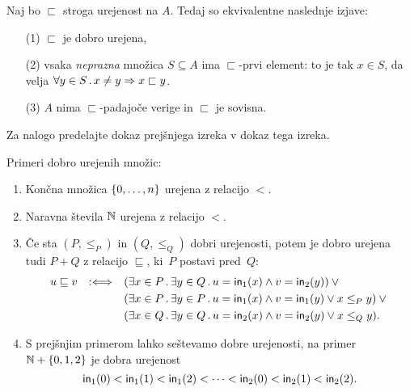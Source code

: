 \begin{izrek}
  \label{izr:dobra-urejenost-karakterizacija}
  Naj bo $\sqsubset$ stroga urejenost na $A$. Tedaj so ekvivalentne naslednje izjave:
  \begin{enumerate}
  \item[(1)] $\sqsubset$ je dobro urejena,
  \item[(2)] vsaka \emph{neprazna} množica $S \subseteq A$ ima $\sqsubset$-prvi element: to je tak $x \in S$, da velja
    $\forall y \in S \,.\, x \neq y \Rightarrow x \sqsubset y$.
  \item[(3)] $A$ nima $\sqsubset$-padajoče verige in $\sqsubset$ je sovisna.
  \end{enumerate}
\end{izrek}

\begin{dokaz}
  Za nalogo predelajte dokaz prejšnjega izreka v dokaz tega izreka.
\end{dokaz}

\begin{primer}
  Primeri dobro urejenih množic:
  \begin{enumerate}
  \item Končna množica $\left\{0, \ldots, n\right\}$ urejena z relacijo $<$.

  \item Naravna števila $\mathbb{N}$ urejena z relacijo $<$.

  \item Če sta $(P, \leq_P)$ in $(Q, \leq_Q)$ dobri urejenosti, potem je dobro urejena tudi $P + Q$ z relacijo
    $\sqsubseteq$, ki~$P$ postavi pred~$Q$:
    \begin{equation*}
      u \sqsubseteq v \quad {{:}{\Longleftrightarrow}}\quad
      \begin{aligned}[t]
        &(\exists x \in P \,.\, \exists y \in Q \,.\, u = \mathsf{in}_{1}(x) \land v = \mathsf{in}_{2}(y)) \lor {}\\
        &(\exists x \in P \,.\, \exists y \in P \,.\, u = \mathsf{in}_{1}(x) \land v = \mathsf{in}_{1}(y) \lor x \leq_P y) \lor {}\\
        &(\exists x \in Q \,.\, \exists y \in Q \,.\, u = \mathsf{in}_{2}(x) \land v = \mathsf{in}_{2}(y) \lor x \leq_Q y).
      \end{aligned}
    \end{equation*}

  \item
    S prejšnjim primerom lahko seštevamo dobre urejenosti, na primer $\mathbb{N} + \left\{0, 1, 2\right\}$ je dobra
    urejenost
    \begin{equation*}
      \mathsf{in}_{1}(0) < \mathsf{in}_{1}(1) < \mathsf{in}_{1}(2) < \cdots < \mathsf{in}_{2}(0) < \mathsf{in}_{2}(1) < \mathsf{in}_{2}(2).
    \end{equation*}
  \end{enumerate}
\end{primer}

